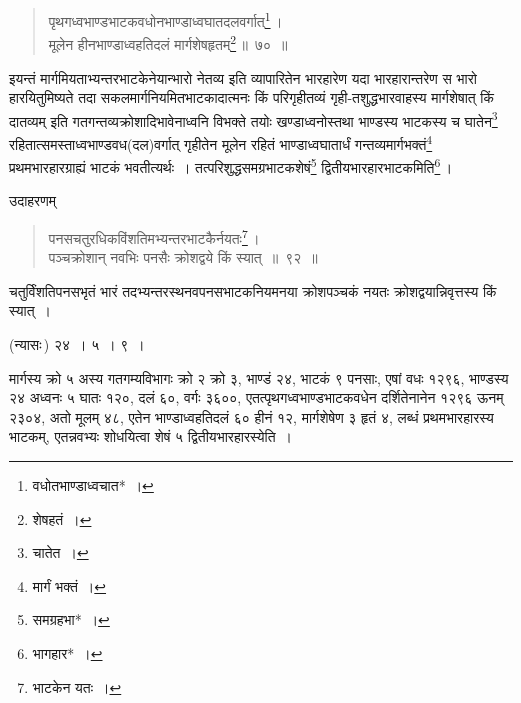 \documentclass[10pt, openany]{book}
\begin{document}
{{

\begin{quote}
    
{\bs पृथगध्वभाण्डभाटकवधोनभाण्डाध्वघातदलवर्गात्\renewcommand{\thefootnote}{\s ७}\footnote{\s *वधोतभाण्डाध्वचात*~।}\,। \\
 मूलेन हीनभाण्डाध्वहतिदलं मार्गशेषहृतम्\renewcommand{\thefootnote}{\s ८}\footnote{\s *शेषहतं~।}\,॥~७०~॥}\end{quote}

\newpage

{इयन्तं मार्गमियताभ्यन्तरभाटकेनेयान्भारो नेतव्य इति व्यापारितेन
भारहारेण यदा}
{भारहारान्तरेण स भारो हारयितुमिष्यते तदा सकलमार्गनियमितभाटकादात्मनः किं
परिगृहीतव्यं गृही-तशुद्धभारवाहस्य मार्गशेषात् किं दातव्यम् इति
गतगन्तव्यक्रोशादिभावेनाध्वनि}
{विभक्ते तयोः खण्डाध्वनोस्तथा भाण्डस्य भाटकस्य च घातेन\renewcommand{\thefootnote}{\s १}\footnote{\s चातेत~।}
रहितात्समस्ताध्वभाण्डवध(दल)वर्गात् गृहीतेन मूलेन रहितं भाण्डाध्वघातार्धं
गन्तव्यमार्गभक्तं\renewcommand{\thefootnote}{\s २}\footnote{\s मार्गं भक्तं~।} प्रथमभारहारग्राह्यं}
{भाटकं भवतीत्यर्थः~। तत्परिशुद्धसमग्रभाटकशेषं\renewcommand{\thefootnote}{\s ३}\footnote{\s *समग्रहभा*~।}
द्वितीयभारहारभाटकमिति\renewcommand{\thefootnote}{\s ४}\footnote{\s *भागहार*~।}\,।}

\vspace{3mm}
{उदाहरणम्\textemdash}

\begin{quote}
{\eg पनसचतुरधिकविंशतिमभ्यन्तरभाटकैर्नयतः\renewcommand{\thefootnote}{\s ५}\footnote{\s *भाटकेन यतः~।}\,। \\
 पञ्चक्रोशान् नवभिः पनसैः क्रोशद्वये किं स्यात्~॥~९२~॥}\end{quote}

{चतुर्विंशतिपनसभृतं भारं तदभ्यन्तरस्थनवपनसभाटकनियमनया क्रोशपञ्चकं नयतः क्रोशद्वयान्निवृत्तस्य किं स्यात्~।}
\vspace{3mm}

 (न्यासः\textendash \,) \hspace{1cm} २४~। ५~। ९~। 
\vspace{3mm}

{मार्गस्य क्रो ५ अस्य गतगम्यविभागः क्रो २ क्रो ३, भाण्डं २४, भाटकं ९
पनसाः,}
{एषां वधः १२९६, भाण्डस्य २४ अध्वनः ५ घातः १२०, दलं ६०, वर्गः ३६००,}
{एतत्पृथगध्वभाण्डभाटकवधेन दर्शितेनानेन १२९६ ऊनम् २३०४, अतो मूलम् ४८,
एतेन}
{भाण्डाध्वहतिदलं ६० हीनं १२, मार्गशेषेण ३ हृतं ४, लब्धं प्रथमभारहारस्य
भाटकम्,}
{एतन्नवभ्यः शोधयित्वा शेषं ५ द्वितीयभारहारस्येति}~। 
\vspace{3mm}

}}
\end{document}
